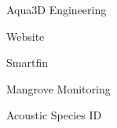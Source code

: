 \item Aqua3D Engineering
\item Website
\item Smartfin
\item Mangrove Monitoring
\item Acoustic Species ID
